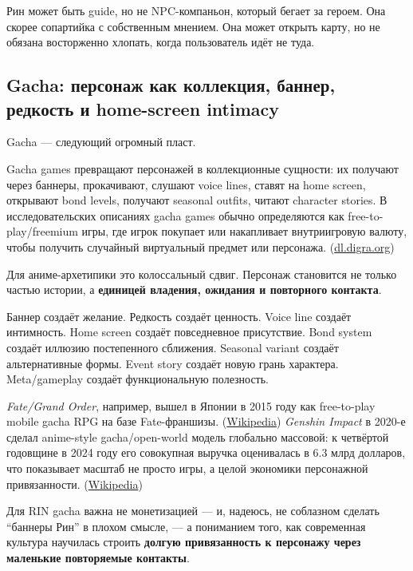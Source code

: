 Рин может быть guide, но не NPC-компаньон, который бегает за героем. Она
скорее сопартийка с собственным мнением. Она может открыть карту, но не
обязана восторженно хлопать, когда пользователь идёт не туда.

\subsection*{Gacha: персонаж как коллекция, баннер, редкость и
home-screen intimacy}

Gacha --- следующий огромный пласт.

Gacha games превращают персонажей в коллекционные сущности: их получают
через баннеры, прокачивают, слушают voice lines, ставят на home screen,
открывают bond levels, получают seasonal outfits, читают character
stories. В исследовательских описаниях gacha games обычно определяются
как free-to-play/\hspace{0pt}freemium игры, где игрок покупает или накапливает
внутриигровую валюту, чтобы получить случайный виртуальный предмет или
персонажа.
(\href{https://dl.digra.org/index.php/dl/article/download/1960/1959/1956?utm_source=chatgpt.com}{dl.digra.org})

Для аниме-архетипики это колоссальный сдвиг. Персонаж становится не
только частью истории, а \textbf{единицей владения, ожидания и
повторного контакта}.

Баннер создаёт желание. Редкость создаёт ценность. Voice line создаёт
интимность. Home screen создаёт повседневное присутствие. Bond system
создаёт иллюзию постепенного сближения. Seasonal variant создаёт
альтернативные формы. Event story создаёт новую грань характера.
Meta/\hspace{0pt}gameplay создаёт функциональную полезность.

\emph{Fate/\hspace{0pt}Grand Order}, например, вышел в Японии в 2015 году как
free-to-play mobile gacha RPG на базе Fate-франшизы.
(\href{https://en.wikipedia.org/wiki/Fate/Grand_Order?utm_source=chatgpt.com}{Wikipedia})
\emph{Genshin Impact} в 2020-е сделал anime-style gacha/\hspace{0pt}open-world
модель глобально массовой: к четвёртой годовщине в 2024 году его
совокупная выручка оценивалась в 6.3 млрд долларов, что показывает
масштаб не просто игры, а целой экономики персонажной привязанности.
(\href{https://en.wikipedia.org/wiki/Genshin_Impact?utm_source=chatgpt.com}{Wikipedia})

Для RIN gacha важна не монетизацией --- и, надеюсь, не соблазном сделать
``баннеры Рин'' в плохом смысле, --- а пониманием того, как современная
культура научилась строить \textbf{долгую привязанность к персонажу
через маленькие повторяемые контакты}.

